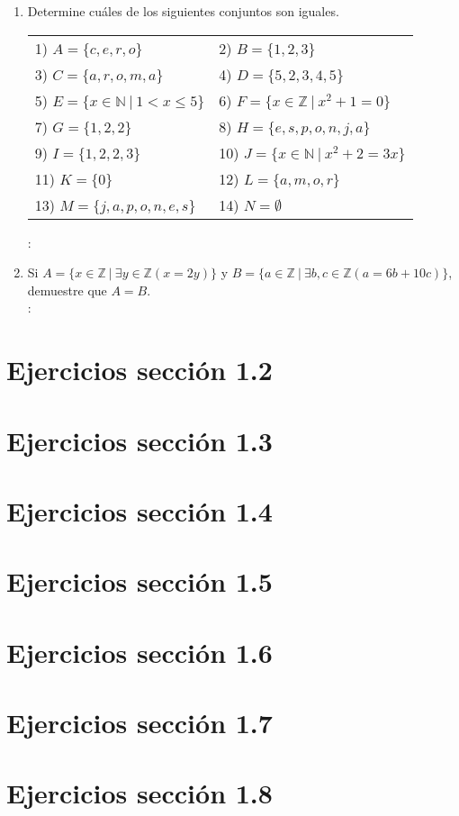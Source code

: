 \begin{enumerate}[label=1.1.\arabic*.]
	\item Determine cuáles de los siguientes conjuntos son iguales.
	\begin{flushleft}
		\begin{tabular}{ll}
			1) $ A = \{ c, e, r, o \} $ & 2) $ B = \{ 1, 2, 3 \} $ \\
			3) $ C = \{ a, r, o, m, a \} $ & 4) $ D = \{ 5, 2, 3, 4, 5 \} $ \\
			5) $ E = \{ x \in \mathbb{N} \ | \ 1 < x \leq 5 \} $ & 6) $ F = \{ x \in \mathbb{Z} \ | \ x^2 + 1 = 0 \} $ \\
			7) $ G = \{ 1, 2, 2 \} $ & 8) $ H = \{ e, s, p, o, n, j, a \} $ \\
			9) $ I = \{ 1, 2, 2, 3 \} $ & 10) $ J = \{ x \in \mathbb{N} \ | \ x^2 + 2  = 3x \} $ \\
			11) $ K = \{ 0 \} $ & 12) $ L = \{ a, m, o, r \} $ \\
			13) $ M = \{ j, a, p, o, n, e, s \} $ & 14) $ N = \emptyset $
		\end{tabular}
	\end{flushleft}
	\solucion: \\
	
	\item Si $ A = \{ x \in \mathbb{Z} \ | \ \exists y \in \mathbb{Z}(x = 2y) \} $ y $ B = \{ a \in \mathbb{Z} \ | \ \exists b, c \in \mathbb{Z} (a = 6b + 10c) \} $, demuestre que $ A = B $. \\
	\solucion: \\
	
\end{enumerate}

\section{Ejercicios sección 1.2}

\section{Ejercicios sección 1.3}

\section{Ejercicios sección 1.4}

\section{Ejercicios sección 1.5}

\section{Ejercicios sección 1.6}

\section{Ejercicios sección 1.7}

\section{Ejercicios sección 1.8}
